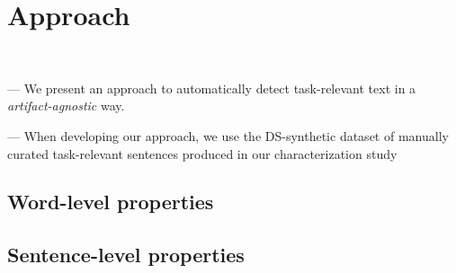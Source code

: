 \section{Approach}
\label{cp5:approaches}
\textcolor{white}{force ident} %

--- We present an approach to automatically detect task-relevant text in a \textit{artifact-agnostic} way. \vspace{3mm}




--- When developing our approach, we use the \acs{DS-synthetic} dataset of manually curated task-relevant sentences produced in our characterization study~\cite{marques2020} \vspace{3mm}


\subsection{Word-level properties}







\subsection{Sentence-level properties}








